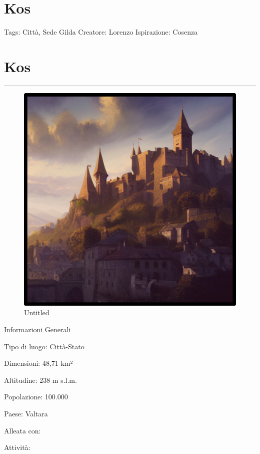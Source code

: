 \section{Kos}\label{kos}

Tags: Città, Sede Gilda Creatore: Lorenzo Ispirazione: Cosenza

\section{Kos}\label{kos-1}

\begin{center}\rule{0.5\linewidth}{0.5pt}\end{center}

\begin{figure}
\centering
\includegraphics{Untitled.png}
\caption{Untitled}
\end{figure}

Informazioni Generali

Tipo di luogo: Città-Stato

Dimensioni: 48,71 km²

Altitudine: 238 m s.l.m.

Popolazione: 100.000

Paese: Valtara

Alleata con:

Attività:

